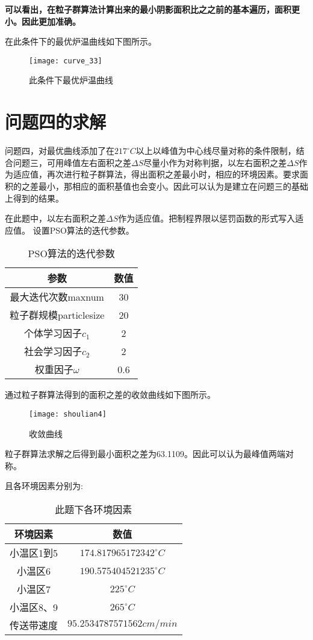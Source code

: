 \documentclass[withoutpreface,bwprint]{cumcmthesis} %
\begin{document}
\textbf{可以看出，在粒子群算法计算出来的最小阴影面积比之之前的基本遍历，面积更小。因此更加准确。}

在此条件下的最优炉温曲线如下图所示。
\begin{figure}[!h]
	\centering
	\texttt{[image: curve\_33]}
	\caption{此条件下最优炉温曲线}
	\label{fig:cur33}
\end{figure}
\newpage

\section{问题四的求解}
问题四，对最优曲线添加了在$217^{\circ}C$以上以峰值为中心线尽量对称的条件限制，结合问题三，可用峰值左右面积之差$\Delta S$尽量小作为对称判据，以左右面积之差$\Delta S$作为适应值，再次进行粒子群算法，得出面积之差最小时，相应的环境因素。要求面积的之差最小，那相应的面积基值也会变小。因此可以认为是建立在问题三的基础上得到的结果。

在此题中，以左右面积之差$\Delta S$作为适应值。把制程界限以惩罚函数的形式写入适应值。
设置PSO算法的迭代参数。

\begin{table}[!h]
	\centering
	\caption{PSO算法的迭代参数}
	\begin{tabular}{cc}
		\toprule[1.5pt]
		参数 & 数值\\
		\midrule[1pt]
		最大迭代次数maxnum & 30\\
		粒子群规模particlesize & 20\\
		个体学习因子$c_1$ & 2\\
		社会学习因子$c_2$ & 2\\
		权重因子$\omega$ & 0.6\\
		\bottomrule[1.5pt]
	\end{tabular}
\end{table}

通过粒子群算法得到的面积之差的收敛曲线如下图所示。
\newpage
\begin{figure}[!h]
	\centering
	\texttt{[image: shoulian4]}
	\caption{收敛曲线}
	\label{fig:shoulian4}
\end{figure}

粒子群算法求解之后得到最小面积之差为63.1109。因此可以认为最峰值两端对称。

且各环境因素分别为:

\begin{table}[!h]
	\centering
	\caption{此题下各环境因素}
	\begin{tabular}{cc}
		\toprule[1.5pt]
		环境因素 & 数值\\
		\midrule[1pt]
		小温区1到5 & $174.817965172342^{\circ}C$\\
		小温区6 & $190.575404521235^{\circ}C$\\
		小温区7 & $225^{\circ}C$\\
		小温区8、9 & $265^{\circ}C$\\
		传送带速度 & $95.2534787571562cm/min$\\
		\bottomrule[1.5pt]
	\end{tabular}
\end{table}
\end{document}
